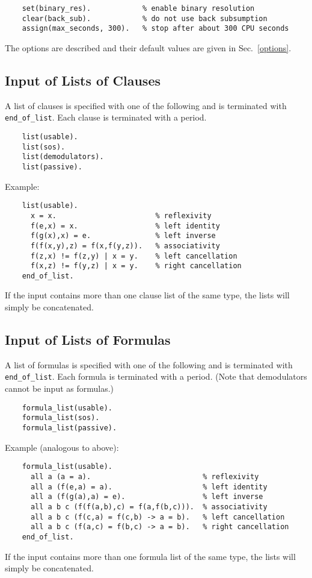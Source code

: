 \documentclass[11pt]{article}
\begin{document}
{\small
\begin{verbatim}
    set(binary_res).            % enable binary resolution
    clear(back_sub).            % do not use back subsumption
    assign(max_seconds, 300).   % stop after about 300 CPU seconds
\end{verbatim}
}
\noindent
The options are described and their default values are given in
Sec.~\ref{options}.

\subsection{Input of Lists of Clauses}

A list of clauses is specified with one of the following and
is terminated with \verb:end_of_list:.
Each clause is terminated with a period.

{\small
\begin{verbatim}
    list(usable).
    list(sos).
    list(demodulators).
    list(passive).
\end{verbatim}
}
\noindent
Example:

{\small
\begin{verbatim}
    list(usable).
      x = x.                       % reflexivity
      f(e,x) = x.                  % left identity
      f(g(x),x) = e.               % left inverse
      f(f(x,y),z) = f(x,f(y,z)).   % associativity
      f(z,x) != f(z,y) | x = y.    % left cancellation
      f(x,z) != f(y,z) | x = y.    % right cancellation
    end_of_list.
\end{verbatim}
}
\noindent
If the input contains more than one clause list of the same type,
the lists will simply be concatenated.

\subsection{Input of Lists of Formulas}

A list of formulas is specified with one of the following and
is terminated with \verb:end_of_list:.
Each formula is terminated with a period.
(Note that demodulators cannot be input as formulas.)

{\small
\begin{verbatim}
    formula_list(usable).
    formula_list(sos).
    formula_list(passive).
\end{verbatim}
}
\noindent
Example (analogous to above):

{\small
\begin{verbatim}
    formula_list(usable).
      all a (a = a).                          % reflexivity
      all a (f(e,a) = a).                     % left identity
      all a (f(g(a),a) = e).                  % left inverse
      all a b c (f(f(a,b),c) = f(a,f(b,c))).  % associativity
      all a b c (f(c,a) = f(c,b) -> a = b).   % left cancellation
      all a b c (f(a,c) = f(b,c) -> a = b).   % right cancellation
    end_of_list.
\end{verbatim}
}
\noindent
If the input contains more than one formula list of the same type,
the lists will simply be concatenated.
\end{document}
